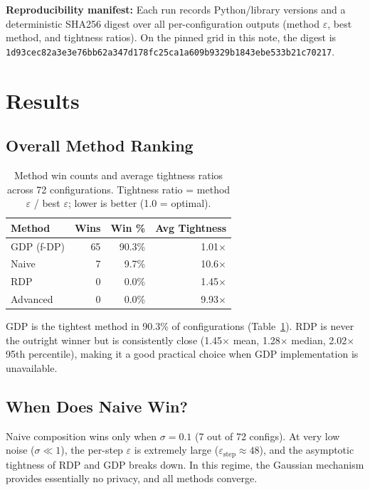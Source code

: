 \documentclass[11pt,a4paper]{article}
\begin{document}
\textbf{Reproducibility manifest:} Each run records Python/library versions and a deterministic SHA256 digest over all per-configuration outputs (method $\varepsilon$, best method, and tightness ratios). On the pinned grid in this note, the digest is \texttt{1d93cec82a3e3e76bb62a347d178fc25ca1a609b9329b1843ebe533b21c70217}.

\section{Results}

\subsection{Overall Method Ranking}

\begin{table}[h]
\centering
\begin{tabular}{lrrr}
\toprule
\textbf{Method} & \textbf{Wins} & \textbf{Win \%} & \textbf{Avg Tightness} \\
\midrule
GDP (f-DP)  & 65 & 90.3\% & 1.01$\times$ \\
Naive       &  7 &  9.7\% & 10.6$\times$ \\
RDP         &  0 &  0.0\% & 1.45$\times$ \\
Advanced    &  0 &  0.0\% & 9.93$\times$ \\
\bottomrule
\end{tabular}
\caption{Method win counts and average tightness ratios across 72 configurations. Tightness ratio = method $\varepsilon$ / best $\varepsilon$; lower is better (1.0 = optimal).}
\label{tab:wins}
\end{table}

GDP is the tightest method in 90.3\% of configurations (Table~\ref{tab:wins}). RDP is never the outright winner but is consistently close (1.45$\times$ mean, 1.28$\times$ median, 2.02$\times$ 95th percentile), making it a good practical choice when GDP implementation is unavailable.

\subsection{When Does Naive Win?}

Naive composition wins only when $\sigma = 0.1$ (7 out of 72 configs). At very low noise ($\sigma \ll 1$), the per-step $\varepsilon$ is extremely large ($\varepsilon_{\text{step}} \approx 48$), and the asymptotic tightness of RDP and GDP breaks down. In this regime, the Gaussian mechanism provides essentially no privacy, and all methods converge.
\end{document}
